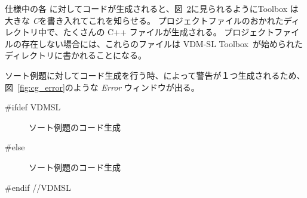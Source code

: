\documentclass[\pformat,12pt]{jarticle}
\newcommand{\ToolboxName}{VDM-SL Toolbox}
\newcommand{\ToolboxName}{VDM++ Toolbox}
\begin{document}
仕様中の各  に対してコードが生成されると、図~\ref{fig:cg2}に見られるようにToolbox は大きな {\em \large{C}}を書き入れてこれを知らせる。
プロジェクトファイルのおかれたディレクトリ中で、たくさんの C++ ファイルが生成される。
プロジェクトファイルの存在しない場合には、これらのファイルは \ToolboxName\ が始められたディレクトリに書かれることになる。

ソート例題に対してコード生成を行う時、\tcg{}によって警告が１つ生成されるため、図~\ref{fig:cg_error}のような {\em Error} ウィンドウが出る。

#ifdef VDMSL
\begin{figure}[tbh]
\begin{center}
\mbox{}
\caption{ソート例題のコード生成}\label{fig:cg2}
\end{center}
\end{figure}
#else
\begin{figure}[tbh]
\begin{center}
\mbox{}
\caption{ソート例題のコード生成}\label{fig:cg2}
\end{center}
\end{figure}
#endif //VDMSL
\end{document}
